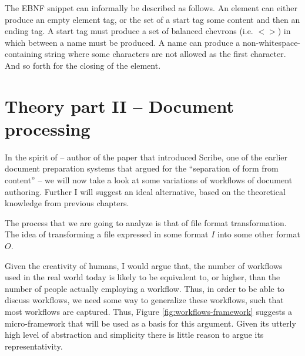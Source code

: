 \documentclass{scrreprt}
\begin{document}
The EBNF snippet can informally be described as follows. An element can either produce an empty element tag, or the set of a start tag some content and then an ending tag. A start tag must produce a set of balanced chevrons (i.e. $<>$) in which between a name must be produced. A name can produce a non-whitespace-containing string where some characters are not allowed as the first character. And so forth for the closing of the element.






















%
%
%
%
%
%


\chapter{Theory part II -- Document processing}
\label{sec:theory-of-document-processing}



\label{sec:microframework}
In the spirit of \citet{reid} -- author of the paper that introduced Scribe, one of the earlier document preparation systems that argued for the ``separation of form from content'' -- we will now take a look at some variations of workflows of document authoring. Further I will suggest an ideal alternative, based on the theoretical knowledge from previous chapters.

The process that we are going to analyze is that of file format transformation. The idea of transforming a file expressed in some format $I$ into some other format $O$.

Given the creativity of humans, I would argue that, the number of workflows used in the real world today is likely to be equivalent to, or higher, than the number of people actually employing a workflow. Thus, in order to be able to discuss workflows, we need some way to generalize these workflows, such that most workflows are captured. Thus, Figure \ref{fig:workflows-framework} suggests a micro-framework that will be used as a basis for this argument. Given its utterly high level of abstraction and simplicity there is little reason to argue its representativity.
\end{document}
